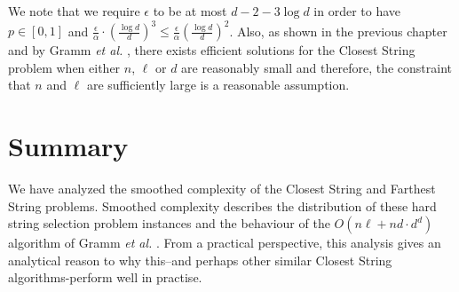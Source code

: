 We note that we require $\epsilon$ to be at most $d - 2 - 3 \log d$ in order to have $p \in [0, 1]$ and $\frac{\epsilon}{\alpha} \cdot \left( \frac{\log d}{d} \right)^3 \leq \frac{\epsilon}{\alpha} \left( \frac{\log d}{d} \right)^2$. Also, as shown in the previous chapter and by Gramm {\em et al.} \cite{GNR01}, there exists efficient solutions for the {\sc Closest String} problem when either $n$, $\ell$ or $d$ are reasonably small and therefore, the constraint that $n$ and $\ell$ are sufficiently large is a reasonable assumption. 


\section{Summary}

We have analyzed the smoothed complexity of the {\sc Closest String} and {\sc Farthest String} problems. Smoothed complexity describes the distribution of these hard string selection problem instances and the behaviour of the $O(n\ell + nd \cdot d^d)$ algorithm of Gramm {\em et al.} \cite{GNR03}.  From a practical perspective, this analysis gives an analytical reason to why this--and perhaps other similar {\sc Closest String} algorithms-perform well in practise.  


